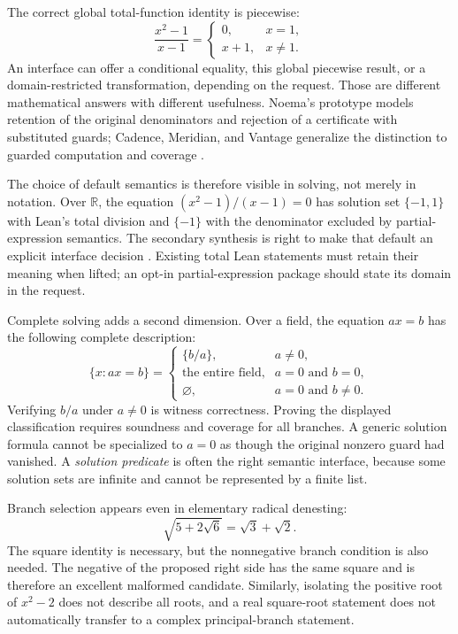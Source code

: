 \documentclass[11pt,letterpaper]{article}
\newcommand{\R}{\mathbb R}
\begin{document}
The correct global total-function identity is piecewise:
\[
 \frac{x^2-1}{x-1}=
 \begin{cases}0,&x=1,\\x+1,&x\ne1.\end{cases}
\]
An interface can offer a conditional equality, this global piecewise result, or
a domain-restricted transformation, depending on the request. Those are
different mathematical answers with different usefulness. Noema's prototype
models retention of the original denominators and rejection of a certificate
with substituted guards; Cadence, Meridian, and Vantage generalize the
distinction to guarded computation and coverage
\cite[\S\S5--6,11.1]{noema}\cite{cadence,meridian,vantage}.

The choice of default semantics is therefore visible in solving, not merely in
notation. Over \(\R\), the equation \((x^2-1)/(x-1)=0\) has solution set
\(\{-1,1\}\) with Lean's total division and \(\{-1\}\) with the denominator
excluded by partial-expression semantics. The secondary synthesis is right to
make that default an explicit interface decision \cite[\S6.1]{secondary}.
Existing total Lean statements must retain their meaning when lifted; an
opt-in partial-expression package should state its domain in the request.

Complete solving adds a second dimension. Over a field, the equation \(ax=b\)
has the following complete description:
\[
 \{x:ax=b\}=
 \begin{cases}
 \{b/a\},&a\ne0,\\
 \text{the entire field},&a=0\text{ and }b=0,\\
 \varnothing,&a=0\text{ and }b\ne0.
 \end{cases}
\]
Verifying \(b/a\) under \(a\ne0\) is witness correctness. Proving the displayed
classification requires soundness and coverage for all branches. A generic
solution formula cannot be specialized to \(a=0\) as though the original
nonzero guard had vanished. A \emph{solution predicate} is often the right
semantic interface, because some solution sets are infinite and cannot be
represented by a finite list.

Branch selection appears even in elementary radical denesting:
\[
 \sqrt{5+2\sqrt6}=\sqrt3+\sqrt2.
\]
The square identity is necessary, but the nonnegative branch condition is also
needed. The negative of the proposed right side has the same square and is
therefore an excellent malformed candidate. Similarly, isolating the positive
root of \(x^2-2\) does not describe all roots, and a real square-root statement
does not automatically transfer to a complex principal-branch statement.
\end{document}
